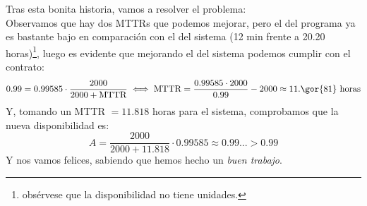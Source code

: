 \begin{problem}[6]
Tras esta bonita historia, vamos a resolver el problema:\\
Observamos que hay dos MTTRs que podemos mejorar, pero el del programa ya es bastante bajo en comparación con el del sistema (12 min frente a 20.20 horas)\footnote{obsérvese que la disponibilidad no tiene unidades.}, luego es evidente que mejorando el del sistema podemos cumplir con el contrato:
\[ 0.99 = 0.99585 \cdot \frac{2000}{2000+\text{MTTR}} \iff \text{MTTR} = \frac{0.99585 \cdot 2000}{0.99} - 2000 \approx 11.\gor{81} \text{ horas}\]
Y, tomando un MTTR $=11.818$ horas para el sistema, comprobamos que la nueva disponibilidad es:
\[ A = \frac{2000}{2000+11.818} \cdot 0.99585 \approx 0.99... > 0.99 \]
Y nos vamos felices, sabiendo que hemos hecho un \textit{buen trabajo}.

\end{problem}

